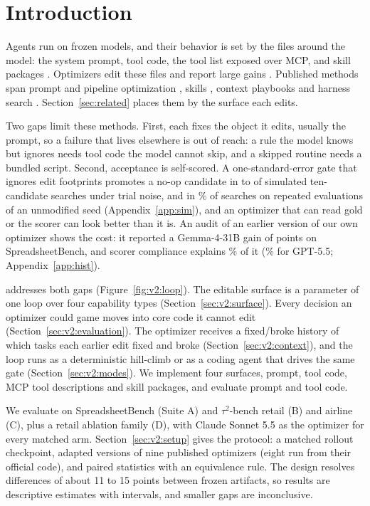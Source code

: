 \section{Introduction}
\label{sec:v2:intro}

Agents run on frozen models, and their behavior is set by the files around the model: the system prompt, tool code, the tool list exposed over MCP, and skill packages \citep{agent_skills_docs}. Optimizers edit these files and report large gains \citep{skillopt,meta-harness}. Published methods span prompt and pipeline optimization \citep{dspy,miprov2-dspy,gepa}, skills \citep{skillopt,evoskill,trace2skill,wikiskill}, context playbooks \citep{ace} and harness search \citep{meta-harness,xu2026harnesslens}. Section~\ref{sec:related} places them by the surface each edits.

Two gaps limit these methods. First, each fixes the object it edits, usually the prompt, so a failure that lives elsewhere is out of reach: a rule the model knows but ignores needs tool code the model cannot skip, and a skipped routine needs a bundled script. Second, acceptance is self-scored. A one-standard-error gate that ignores edit footprints promotes a no-op candidate in \simKoneFalseB{} to \simKoneFalseA{} of simulated ten-candidate searches under trial noise, and in \nullOneStageTen{}\% of searches on repeated evaluations of an unmodified seed (Appendix~\ref{app:sim}), and an optimizer that can read gold or the scorer can look better than it is. An audit of an earlier version of our own optimizer shows the cost: it reported a Gemma-4-31B gain of \histGemmaDeltaSaved{} points on SpreadsheetBench, and scorer compliance explains \histGemmaComplianceShare{}\% of it (\histGptComplianceShare{}\% for GPT-5.5; Appendix~\ref{app:hist}).

\capevolve{} addresses both gaps (Figure~\ref{fig:v2:loop}). The editable surface is a parameter of one loop over four capability types (Section~\ref{sec:v2:surface}). Every decision an optimizer could game moves into core code it cannot edit (Section~\ref{sec:v2:evaluation}). The optimizer receives a fixed/broke history of which tasks each earlier edit fixed and broke (Section~\ref{sec:v2:context}), and the loop runs as a deterministic hill-climb or as a coding agent that drives the same gate (Section~\ref{sec:v2:modes}). We implement four surfaces, prompt, tool code, MCP tool descriptions and skill packages, and evaluate prompt and tool code.

We evaluate on SpreadsheetBench (Suite A) and $\tau^2$-bench retail (B) and airline (C), plus a retail ablation family (D), with Claude Sonnet 5.5 as the optimizer for every matched arm. Section~\ref{sec:v2:setup} gives the protocol: a matched rollout checkpoint, adapted versions of nine published optimizers (eight run from their official code), and paired statistics with an equivalence rule. The design resolves differences of about 11 to 15 points between frozen artifacts, so results are descriptive estimates with intervals, and smaller gaps are inconclusive. 

